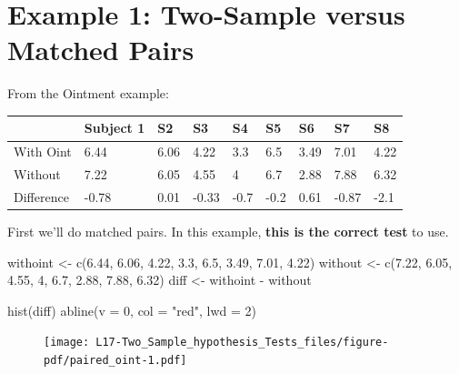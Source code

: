 \documentclass[
  letterpaper,
  DIV=11,
  numbers=noendperiod,
  oneside]{scrreprt}
\newenvironment{Shaded}{\begin{snugshade}}{\end{snugshade}}
\newcommand{\AttributeTok}[1]{\textcolor[rgb]{0.40,0.45,0.13}{#1}}
\newcommand{\DecValTok}[1]{\textcolor[rgb]{0.68,0.00,0.00}{#1}}
\newcommand{\FloatTok}[1]{\textcolor[rgb]{0.68,0.00,0.00}{#1}}
\newcommand{\FunctionTok}[1]{\textcolor[rgb]{0.28,0.35,0.67}{#1}}
\newcommand{\NormalTok}[1]{\textcolor[rgb]{0.00,0.23,0.31}{#1}}
\newcommand{\OtherTok}[1]{\textcolor[rgb]{0.00,0.23,0.31}{#1}}
\newcommand{\SpecialCharTok}[1]{\textcolor[rgb]{0.37,0.37,0.37}{#1}}
\newcommand{\StringTok}[1]{\textcolor[rgb]{0.13,0.47,0.30}{#1}}
\begin{document}
\hypertarget{example-1-two-sample-versus-matched-pairs}{%
\section{Example 1: Two-Sample versus Matched
Pairs}\label{example-1-two-sample-versus-matched-pairs}}

From the Ointment example:

\begin{longtable}[]{@{}lllllllll@{}}
\toprule\noalign{}
& Subject 1 & S2 & S3 & S4 & S5 & S6 & S7 & S8 \\
\midrule\noalign{}
\endhead
\bottomrule\noalign{}
\endlastfoot
With Oint & 6.44 & 6.06 & 4.22 & 3.3 & 6.5 & 3.49 & 7.01 & 4.22 \\
Without & 7.22 & 6.05 & 4.55 & 4 & 6.7 & 2.88 & 7.88 & 6.32 \\
Difference & -0.78 & 0.01 & -0.33 & -0.7 & -0.2 & 0.61 & -0.87 & -2.1 \\
\end{longtable}

First we'll do matched pairs. In this example, \textbf{this is the
correct test} to use.

\begin{Shaded}
\begin{Highlighting}[]
\NormalTok{withoint }\OtherTok{\textless{}{-}} \FunctionTok{c}\NormalTok{(}\FloatTok{6.44}\NormalTok{, }\FloatTok{6.06}\NormalTok{, }\FloatTok{4.22}\NormalTok{, }\FloatTok{3.3}\NormalTok{, }\FloatTok{6.5}\NormalTok{, }\FloatTok{3.49}\NormalTok{, }\FloatTok{7.01}\NormalTok{, }\FloatTok{4.22}\NormalTok{)}
\NormalTok{without }\OtherTok{\textless{}{-}} \FunctionTok{c}\NormalTok{(}\FloatTok{7.22}\NormalTok{, }\FloatTok{6.05}\NormalTok{, }\FloatTok{4.55}\NormalTok{, }\DecValTok{4}\NormalTok{, }\FloatTok{6.7}\NormalTok{, }\FloatTok{2.88}\NormalTok{, }\FloatTok{7.88}\NormalTok{, }\FloatTok{6.32}\NormalTok{)}
\NormalTok{diff }\OtherTok{\textless{}{-}}\NormalTok{ withoint }\SpecialCharTok{{-}}\NormalTok{ without}

\FunctionTok{hist}\NormalTok{(diff)}
\FunctionTok{abline}\NormalTok{(}\AttributeTok{v =} \DecValTok{0}\NormalTok{, }\AttributeTok{col =} \StringTok{"red"}\NormalTok{, }\AttributeTok{lwd =} \DecValTok{2}\NormalTok{)}
\end{Highlighting}
\end{Shaded}

\begin{figure}[H]

{\centering \texttt{[image: L17-Two\_Sample\_hypothesis\_Tests\_files/figure-pdf/paired\_oint-1.pdf]}

}

\end{figure}
\end{document}
